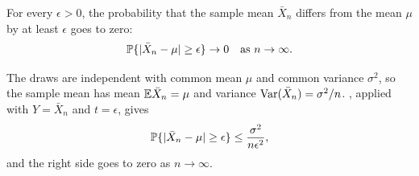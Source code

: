 \begin{propositionE}
\label{thm:mean-consistency}
For every $\epsilon > 0$, the probability that the sample mean $\bar X_n$ differs from the mean $\mu$ by at least $\epsilon$ goes to zero:
\[
  \mathbb{P}\{|\bar X_n - \mu| \ge \epsilon\} \to 0
  \quad \text{as } n \to \infty.
\]
\end{propositionE}

\begin{proofE}
The draws are independent with common mean $\mu$ and common variance $\sigma^2$, so the sample mean has mean $\mathbb{E} \bar X_n = \mu$ and variance $\operatorname{Var}(\bar X_n) = \sigma^2 / n$.
, applied with $Y = \bar X_n$ and $t = \epsilon$, gives
\[
  \mathbb{P}\{|\bar X_n - \mu| \ge \epsilon\} \le \frac{\sigma^2}{n \epsilon^2},
\]
and the right side goes to zero as $n \to \infty$.
\end{proofE}
